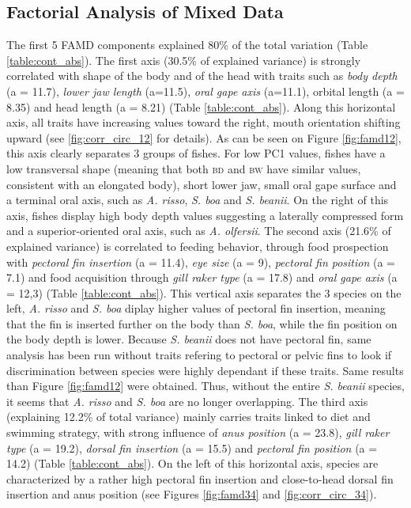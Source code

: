 
\subsection{Factorial Analysis of Mixed Data}

The first 5 FAMD components explained 80\% of the total variation (Table \ref{table:cont_abs}). The first axis (30.5\% of explained variance) is strongly correlated with shape of the body and of the head with traits such as \emph{body depth} (a = 11.7), \emph{lower jaw length} (a=11.5), \emph{oral gape axis} (a=11.1), orbital length (a = 8.35) and head length (a = 8.21) (Table \ref{table:cont_abs}). Along this horizontal axis, all traits have increasing values toward the right, mouth orientation shifting upward (see \ref{fig:corr_circ_12} for details). As can be seen on Figure \ref{fig:famd12}, this axis clearly separates 3 groups of fishes. For low PC1 values, fishes have a low transversal shape (meaning that both \textsc{bd} and \textsc{bw} have similar values, consistent with an elongated body), short lower jaw, small oral gape surface and a terminal oral axis, such as \textit{A. risso}, \textit{S. boa} and \textit{S. beanii}. On the right of this axis, fishes display high body depth values suggesting a laterally compressed form and a superior-oriented oral axis, such as \textit{A. olfersii}. 
The second axis (21.6\% of explained variance) is correlated to feeding behavior, through food prospection with \emph{pectoral fin insertion} (a = 11.4), \emph{eye size} (a = 9), \emph{pectoral fin position} (a = 7.1) and food acquisition through \emph{gill raker type} (a = 17.8) and \emph{oral gape axis} (a = 12,3) (Table \ref{table:cont_abs}). This vertical axis separates the 3 species on the left, \textit{A. risso} and \textit{S. boa} diplay higher values of pectoral fin insertion, meaning that the fin is inserted further on the body than \textit{S. boa}, while the fin position on the body depth is lower. Because \textit{S. beanii} does not have pectoral fin, same analysis has been run without traits refering to pectoral or pelvic fins to look if discrimination between species were highly dependant if these traits. Same results than Figure \ref{fig:famd12} were obtained. Thus, without the entire \textit{S. beanii} species, it seems that \textit{A. risso} and \textit{S. boa} are no longer overlapping. 
The third axis (explaining 12.2\% of total variance) mainly carries traits linked to diet and swimming strategy, with strong influence of \emph{anus position} (a = 23.8), \emph{gill raker type} (a = 19.2), \emph{dorsal fin insertion} (a = 15.5) and \emph{pectoral fin position} (a = 14.2) (Table \ref{table:cont_abs}). On the left of this horizontal axis, species are characterized by a rather high pectoral fin insertion and close-to-head dorsal fin insertion and anus position (see Figures \ref{fig:famd34} and \ref{fig:corr_circ_34}).

